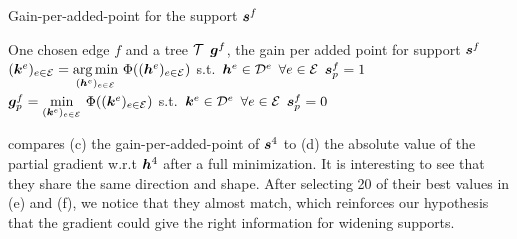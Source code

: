\begin{algorithm}[!ht]
    \caption{Gain-per-added-point for the support $\bm{s}^f$} \label{alg_gain_per_added_point}
  \begin{algorithmic}[1]
    \Input One chosen edge $f$ and a tree $\mathcal T$
    \Output $\bm{g}^f$, the gain per added point for support $\bm{s}^f$
    \State $(\bm{k}^e)_{e \in \mathcal E} = \underset{(\bm{h}^e)_{e \in \mathcal E}}{\arg\min}~ \Phi ((\bm{h}^e)_{e \in \mathcal E})$ \quad s.t.~$\bm{h}^e \in {\mathcal D}^e$ \quad $\forall e \in \mathcal E$ 
    	\State $\bm{s}^f_p = 1$ 
    	\State $\bm{g}^f_p = \underset{(\bm{k}^e)_{e \in \mathcal E}}{\min}~ \Phi ((\bm{k}^e)_{e \in \mathcal E})$ \quad s.t.~$\bm{k}^e \in {\mathcal D}^e$ \quad $\forall e \in \mathcal E$
    	\State $\bm{s}^f_p = 0$ 
    \EndFor
  \end{algorithmic}
\end{algorithm}

 compares (c) the gain-per-added-point of $\bm{s}^4$ to (d) the absolute value of the partial gradient w.r.t $\bm{h}^4$ after a full minimization. It is interesting to see that they share the same direction and shape. After selecting 20 of their best values in (e) and (f), we notice that they almost match, which reinforces our hypothesis that the gradient could give the right information for widening supports.


